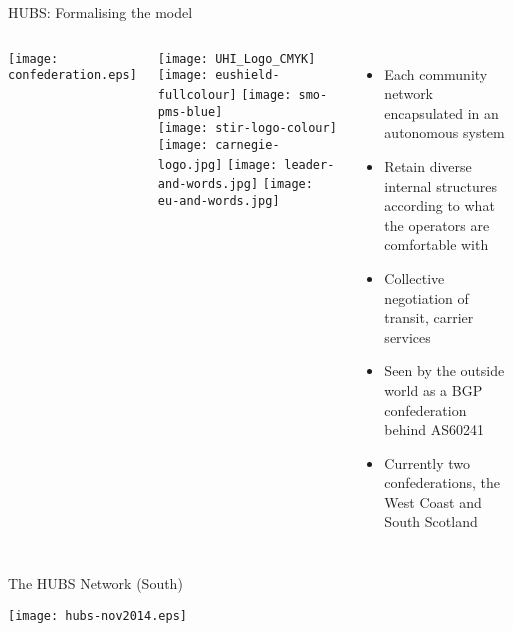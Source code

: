 \documentclass{beamer}
\begin{document}
\begin{frame}{HUBS: Formalising the model}
  \begin{columns}
    \texttt{[image: confederation.eps]}\\
    \vspace{-0.5\baselineskip}
    \begin{center}
      \texttt{[image: UHI\_Logo\_CMYK]}
      \hspace{1pt}
      \texttt{[image: eushield-fullcolour]}
      \hspace{1pt}
      \texttt{[image: smo-pms-blue]}\\
      \vspace{0.25\baselineskip}
      \texttt{[image: stir-logo-colour]}
      \hspace{1pt}
      \texttt{[image: carnegie-logo.jpg]}
      \hspace{1pt}
      \texttt{[image: leader-and-words.jpg]}
      \hspace{1pt}
      \texttt{[image: eu-and-words.jpg]}\\
    \end{center}
    \begin{itemize}
      \item Each community network encapsulated in an autonomous
        system
      \item Retain diverse internal structures according to what the
        operators are comfortable with
      \item Collective negotiation of transit, carrier services
      \item Seen by the outside world as a BGP confederation behind
        AS60241
      \item Currently two confederations, the West Coast and
        South Scotland
    \end{itemize}
  \end{columns}
\end{frame}
\begin{frame}{The HUBS Network (South)}
  \begin{center}
    \texttt{[image: hubs-nov2014.eps]}
  \end{center}
\end{frame}
\end{document}
